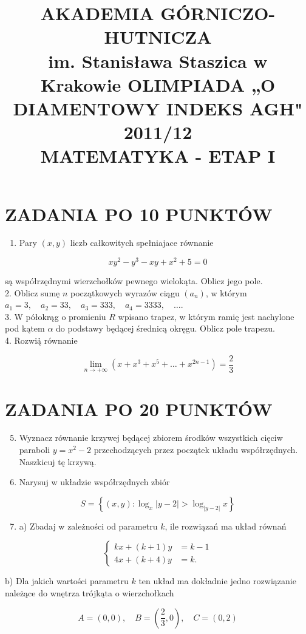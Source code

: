 \documentclass[10pt]{article}
\title{AKADEMIA GÓRNICZO-HUTNICZA \\
 im. Stanisława Staszica w Krakowie OLIMPIADA „O DIAMENTOWY INDEKS AGH" 2011/12 \\
 MATEMATYKA - ETAP I }
\author{}
\date{}
\begin{document}
\maketitle
\section*{ZADANIA PO 10 PUNKTÓW}
\begin{enumerate}
  \item Pary $(x, y)$ liczb całkowitych spełniajace równanie
\end{enumerate}

$$
x y^{2}-y^{3}-x y+x^{2}+5=0
$$

są współrzędnymi wierzchołków pewnego wielokąta. Oblicz jego pole.\\
2. Oblicz sumę $n$ początkowych wyrazów ciągu $\left(a_{n}\right)$, w którym $a_{1}=3, \quad a_{2}=33, \quad a_{3}=333, \quad a_{4}=3333, \quad \ldots$.\\
3. W półokrąg o promieniu $R$ wpisano trapez, w którym ramię jest nachylone pod kątem $\alpha$ do podstawy będącej średnicą okręgu. Oblicz pole trapezu.\\
4. Rozwią̇̇ równanie

$$
\lim _{n \rightarrow+\infty}\left(x+x^{3}+x^{5}+\ldots+x^{2 n-1}\right)=\frac{2}{3}
$$

\section*{ZADANIA PO 20 PUNKTÓW}
\begin{enumerate}
  \setcounter{enumi}{4}
  \item Wyznacz równanie krzywej będącej zbiorem środków wszystkich cięciw paraboli $y=x^{2}-2$ przechodzących przez początek układu współrzędnych. Naszkicuj tę krzywą.
  \item Narysuj w układzie współrzędnych zbiór
\end{enumerate}

$$
S=\left\{(x, y): \log _{x}|y-2|>\log _{|y-2|} x\right\}
$$

\begin{enumerate}
  \setcounter{enumi}{6}
  \item a) Zbadaj w zależności od parametru $k$, ile rozwiązań ma układ równań
\end{enumerate}

$$
\left\{\begin{aligned}
k x+(k+1) y & =k-1 \\
4 x+(k+4) y & =k .
\end{aligned}\right.
$$

b) Dla jakich wartości parametru $k$ ten układ ma dokładnie jedno rozwiązanie należące do wnętrza trójkąta o wierzchołkach

$$
A=(0,0), \quad B=\left(\frac{2}{3}, 0\right), \quad C=(0,2)
$$
\end{document}
